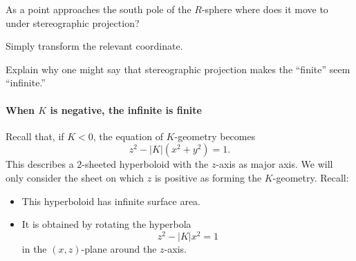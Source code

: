 \documentclass[newpage,hints,handout]{ximera}
\begin{document}
\begin{problem}
  As a point approaches the south pole of the $R$-sphere where does it
  move to under stereographic projection?
  \begin{hint}
    Simply transform the relevant coordinate.
  \end{hint}
  \begin{freeResponse}
  \end{freeResponse}
\end{problem}



\begin{problem}
  Explain why one might say that stereographic projection makes the
  ``finite'' seem ``infinite.''
    \begin{freeResponse}
    \end{freeResponse}
\end{problem}




\paragraph{When $K$ is negative, the infinite is finite}


Recall that, if $K<0$, the equation of $K$-geometry becomes
\[
z^{2}-|K|(x^{2}+y^{2})=1.
\]
This describes a $2$-sheeted hyperboloid with the $z$-axis as major axis.  We
will only consider the sheet on which $z$ is positive as forming the
$K$-geometry.  Recall:

\begin{itemize}
\item This hyperboloid has infinite surface area.
\item It is obtained by rotating the hyperbola
  \[z^{2}-\left\vert K\right\vert x^{2}=1\]
  in the $(x,z)$-plane around the $z$-axis.
\end{itemize}
\end{document}
